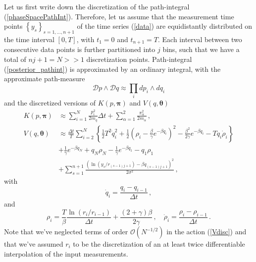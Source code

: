 \documentclass[11pt, a4paper]{article}
\newcommand{\bt}{\pmb\theta}
\begin{document}
Let us first write down the discretization of the path-integral (\ref{phaseSpacePathInt}).
Therefore, let us assume that the measurement time points $\left\{ y_s \right\}_{s=1,\dots, n+1}$ of the time series (\ref{data}) are equidistantly distributed on the time interval $[0,T]$, with $t_1=0$ and $t_{n+1}=T$.
Each interval between two consecutive data points is further partitioned into $j$ bins, such that we have a total of $nj+1=N>>1$ discretization points.
Path-integral (\ref{posterior_pathint}) is approximated by an ordinary integral, with the approximate path-measure
\begin{equation}
  \mathcal Dp\wedge\mathcal Dq
  \approx
  \prod_i dp_i\wedge dq_i
\end{equation}
and the discretized versions of $K( p,{\pmb\pi})$ and $V( q,\bt)$
\begin{align}
   K( p,{\pmb\pi})
   &\approx
   \sum_{i=1}^N
   \frac{ p_i^2}{2m_q}\Delta t
   +
   \sum_{\alpha=1}^2\frac{\pi_\alpha^2}{2m_\alpha}\,,\label{Kdisc}
   \\
   V(q,\bt)
   &\approx
   \frac{\Delta t}{T}
   \sum_{i=2}^{N}
   \left\{
    \frac{1}{2}
    T^2 \dot q_i^2
    +
    \frac{1}{2}
     \left(
        \rho_i-\frac{\beta}{\gamma}e^{-\beta q_i}
     \right)^2
    -
    \frac{\beta^2}{2\gamma}
    e^{-\beta q_i}
   -
    T q_i\dot\rho_i
   \right\}\label{Vdisc}
  \\
  &+
  \frac{1}{\gamma}
  e^{-\beta q_N}
  +
  q_N \rho_{N}
  -
  \frac{1}{\gamma}
  e^{-\beta q_1}
  -
  q_1 \rho_{1}
  \nonumber
  \\
  & +
  \sum_{s=1}^{n+1}
  \frac{(\ln(y_s/r_{(s-1)j+1}) - {\beta q_{(s-1)j+1}})^2}{2\sigma^2}
  \nonumber
   \,,
\end{align}
with
\begin{equation}
  \dot q_i = \frac{q_i-q_{i-1}}{\Delta t}\,,
\end{equation}
and
\begin{equation}\label{rhodisc}
\rho_i = \frac{T}{\beta} \frac{\ln(r_{i}/r_{i-1})}{\Delta t}
+
\frac{(2+\gamma)\beta}{2\gamma}
\,,\quad
\dot\rho_i = \frac{\rho_i-\rho_{i-1}}{\Delta t}\,.
\end{equation}
Note that we've neglected terms of order $\mathcal O(N^{-1/2})$ in the action (\ref{Vdisc}) and that we've assumed $r_i$ to be the discretization of an at least twice differentiable interpolation of the input measurements.

\end{document}
